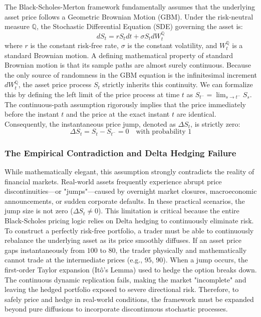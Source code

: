 The Black-Scholes-Merton framework fundamentally assumes that the underlying asset price follows a Geometric Brownian Motion (GBM). Under the risk-neutral measure $\mathbb{Q}$, the Stochastic Differential Equation (SDE) governing the asset is:
\begin{equation}\label{eq:BS_SDE}
dS_t = r S_t dt + \sigma S_t dW_t^\mathbb{Q}
\end{equation}
where $r$ is the constant risk-free rate, $\sigma$ is the constant volatility, and $W_t^\mathbb{Q}$ is a standard Brownian motion. A defining mathematical property of standard Brownian motion is that its sample paths are almost surely continuous. Because the only source of randomness in the GBM equation is the infinitesimal increment $dW_t^\mathbb{Q}$, the asset price process $S_t$ strictly inherits this continuity. We can formalize this by defining the left limit of the price process at time $t$ as $S_{t^-} = \lim_{s \to t^-} S_s$. The continuous-path assumption rigorously implies that the price immediately before the instant $t$ and the price at the exact instant $t$ are identical. Consequently, the instantaneous price jump, denoted as $\Delta S_t$, is strictly zero:
$$\Delta S_t = S_t - S_{t^-} = 0 \quad \text{with probability 1}$$
\subsubsection{The Empirical Contradiction and Delta Hedging Failure}

While mathematically elegant, this assumption strongly contradicts the reality of financial markets. Real-world assets frequently experience abrupt price discontinuities—or "jumps"—caused by overnight market closures, macroeconomic announcements, or sudden corporate defaults. In these practical scenarios, the jump size is not zero ($\Delta S_t \neq 0$). This limitation is critical because the entire Black-Scholes pricing logic relies on Delta hedging to continuously eliminate risk. To construct a perfectly risk-free portfolio, a trader must be able to continuously rebalance the underlying asset as its price smoothly diffuses. If an asset price gaps instantaneously from $100$ to $80$, the trader physically and mathematically cannot trade at the intermediate prices (e.g., $95$, $90$). When a jump occurs, the first-order Taylor expansion (Itô's Lemma) used to hedge the option breaks down. The continuous dynamic replication fails, making the market "incomplete" and leaving the hedged portfolio exposed to severe directional risk. Therefore, to safely price and hedge in real-world conditions, the framework must be expanded beyond pure diffusions to incorporate discontinuous stochastic processes.
